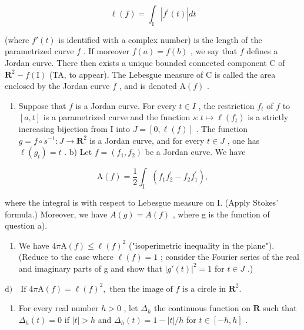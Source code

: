 \[
\ell (f) = \int_ {\mathrm{I}} | f ^ {\prime} (t) | d t
\]

(where \(f'(t)\) is identified with a complex number) is the length of the parametrized curve \(f\) . If moreover \(f(a) = f(b)\) , we say that \(f\) defines a Jordan curve. There then exists a unique bounded connected component C of \(\mathbf{R}^2 - f(\mathrm{I})\) (TA, to appear). The Lebesgue measure of C is called the area enclosed by the Jordan curve \(f\) , and is denoted \(\mathrm{A}(f)\) .

\begin{enumerate}
\def\labelenumi{\alph{enumi})}
\tightlist
\item
    Suppose that \(f\) is a Jordan curve. For every \(t \in I\) , the restriction \(f_t\) of \(f\) to \([a, t]\) is a parametrized curve and the function \(s: t \mapsto \ell(f_t)\) is a strictly increasing bijection from I into \(J = [0, \ell(f)]\) . The function \(g = f \circ s^{-1}: J \to \mathbf{R}^2\) is a Jordan curve, and for every \(t \in J\) , one has \(\ell(g_t) = t\) . b) Let \(f = (f_1, f_2)\) be a Jordan curve. We have
\end{enumerate}

\[
\mathrm{A} (f) = \frac {1}{2} \int_ {\mathrm{I}} (f _ {1} f _ {2} ^ {\prime} - f _ {2} f _ {1} ^ {\prime}),
\]

where the integral is with respect to Lebesgue measure on I. (Apply Stokes' formula.) Moreover, we have \(A(g) = A(f)\) , where g is the function of question a).

\begin{enumerate}
\def\labelenumi{\alph{enumi})}
\setcounter{enumi}{2}
\tightlist
\item
  We have \(4\pi\mathrm{A}(f)\leqslant\ell(f)^{2}\) ("isoperimetric inequality in the plane"). (Reduce to the case where \(\ell(f)=1\) ; consider the Fourier series of the real and imaginary parts of g and show that \(|g'(t)|^{2}=1\) for \(t\in J\) .)
\end{enumerate}

\(\text{d)}\quad\text{If }4\pi\mathrm{A}(f)=\ell(f)^{2},\text{ then the image of }f\text{ is a circle in }\mathbf{R}^{2}.\)

\begin{enumerate}
\def\labelenumi{\arabic{enumi})}
\setcounter{enumi}{44}
\tightlist
\item
  For every real number \(h > 0\) , let \(\Delta_h\) the continuous function on \(\mathbf{R}\) such that \(\Delta_h(t) = 0\) if \(|t| > h\) and \(\Delta_h(t) = 1 - |t| / h\) for \(t \in [-h, h]\) .
\end{enumerate}


